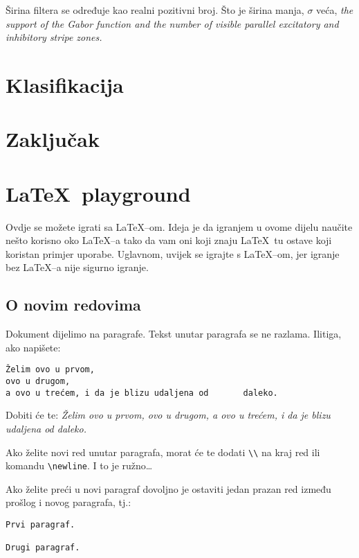 \documentclass{article}
\begin{document}
Širina filtera se određuje kao realni pozitivni broj. Što je širina manja,
$\sigma$ veća, \emph{the support of the Gabor function and the number of
visible parallel excitatory and inhibitory stripe zones.}

\section{Klasifikacija}

\section{Zaključak}




\newpage
\appendix
\section{\LaTeX~playground}
Ovdje se možete igrati sa \LaTeX--om. Ideja je da igranjem u ovome dijelu
naučite nešto korisno oko \LaTeX--a tako da vam oni koji znaju \LaTeX~tu ostave
koji koristan primjer uporabe. Uglavnom, uvijek se igrajte s \LaTeX--om, jer igranje bez \LaTeX--a nije sigurno igranje. 

\subsection{O novim redovima}
Dokument dijelimo na paragrafe. Tekst unutar paragrafa se ne razlama. Ilitiga,
ako napišete:
\begin{verbatim}
Želim ovo u prvom,
ovo u drugom,
a ovo u trećem, i da je blizu udaljena od       daleko.
\end{verbatim}
Dobiti će te:
\emph{Želim ovo u prvom,
ovo u drugom,
a ovo u trećem, i da je blizu udaljena od       daleko.}

Ako želite novi red unutar paragrafa, morat će te dodati
\verb|\\| na kraj red ili komandu \verb|\newline|. I to je ružno\ldots

Ako želite preći u novi paragraf dovoljno je ostaviti jedan prazan red između
prošlog i novog paragrafa, tj.:
\begin{verbatim}
Prvi paragraf.

Drugi paragraf.
\end{verbatim}
\end{document}
